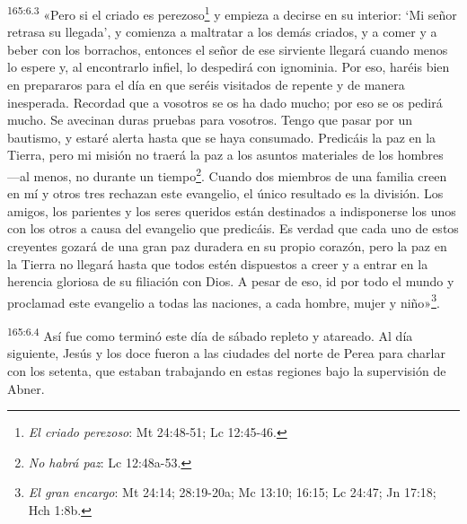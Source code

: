\par 
\textsuperscript{165:6.3} «Pero si el criado es perezoso\footnote{\textit{El criado perezoso}: Mt 24:48-51; Lc 12:45-46.} y empieza a decirse en su interior: `Mi señor retrasa su llegada', y comienza a maltratar a los demás criados, y a comer y a beber con los borrachos, entonces el señor de ese sirviente llegará cuando menos lo espere y, al encontrarlo infiel, lo despedirá con ignominia. Por eso, haréis bien en prepararos para el día en que seréis visitados de repente y de manera inesperada. Recordad que a vosotros se os ha dado mucho; por eso se os pedirá mucho. Se avecinan duras pruebas para vosotros. Tengo que pasar por un bautismo, y estaré alerta hasta que se haya consumado. Predicáis la paz en la Tierra, pero mi misión no traerá la paz a los asuntos materiales de los hombres ---al menos, no durante un tiempo\footnote{\textit{No habrá paz}: Lc 12:48a-53.}. Cuando dos miembros de una familia creen en mí y otros tres rechazan este evangelio, el único resultado es la división. Los amigos, los parientes y los seres queridos están destinados a indisponerse los unos con los otros a causa del evangelio que predicáis. Es verdad que cada uno de estos creyentes gozará de una gran paz duradera en su propio corazón, pero la paz en la Tierra no llegará hasta que todos estén dispuestos a creer y a entrar en la herencia gloriosa de su filiación con Dios. A pesar de eso, id por todo el mundo y proclamad este evangelio a todas las naciones, a cada hombre, mujer y niño»\footnote{\textit{El gran encargo}: Mt 24:14; 28:19-20a; Mc 13:10; 16:15; Lc 24:47; Jn 17:18; Hch 1:8b.}.

\par 
\textsuperscript{165:6.4} Así fue como terminó este día de sábado repleto y atareado. Al día siguiente, Jesús y los doce fueron a las ciudades del norte de Perea para charlar con los setenta, que estaban trabajando en estas regiones bajo la supervisión de Abner.